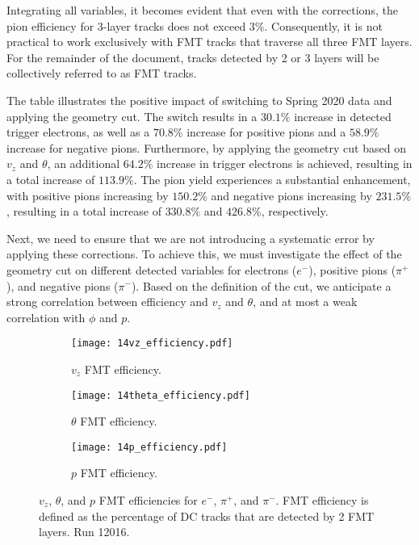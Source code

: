     Integrating all variables, it becomes evident that even with the corrections, the pion efficiency for 3-layer tracks does not exceed $3\%$.
    Consequently, it is not practical to work exclusively with FMT tracks that traverse all three FMT layers.
    For the remainder of the document, tracks detected by 2 or 3 layers will be collectively referred to as FMT tracks.

    The table illustrates the positive impact of switching to Spring 2020 data and applying the geometry cut.
    The switch results in a $30.1\%$ increase in detected trigger electrons, as well as a $70.8\%$ increase for positive pions and a $58.9\%$ increase for negative pions.
    Furthermore, by applying the geometry cut based on $v_z$ and $\theta$, an additional $64.2\%$ increase in trigger electrons is achieved, resulting in a total increase of $113.9\%$.
    The pion yield experiences a substantial enhancement, with positive pions increasing by $150.2\%$ and negative pions increasing by $231.5\%$, resulting in a total increase of $330.8\%$ and $426.8\%$, respectively.

    Next, we need to ensure that we are not introducing a systematic error by applying these corrections.
    To achieve this, we must investigate the effect of the geometry cut on different detected variables for electrons ($e^-$), positive pions ($\pi^+$), and negative pions ($\pi^-$).
    Based on the definition of the cut, we anticipate a strong correlation between efficiency and $v_z$ and $\theta$, and at most a weak correlation with $\phi$ and $p$.

    \begin{figure}
        \begin{subfigure}[b]{\textwidth}
            \texttt{[image: 14vz\_efficiency.pdf]}
            \caption{$v_z$ FMT efficiency.}
            \label{fig::14.14::fmt_efficiency_vz}
        \end{subfigure}
        \begin{subfigure}[b]{\textwidth}
            \texttt{[image: 14theta\_efficiency.pdf]}
            \caption{$\theta$ FMT efficiency.}
            \label{fig::14.14::fmt_efficiency_theta}
        \end{subfigure}
        \begin{subfigure}[b]{\textwidth}
            \texttt{[image: 14p\_efficiency.pdf]}
            \caption{$p$ FMT efficiency.}
            \label{fig::14.14::fmt_efficiency_p}
        \end{subfigure}

        \caption[$v_z$, $\theta$, and $p$ FMT efficiencies for $e^-$, $\pi^+$, and $\pi^-$ in run 12016]
        {$v_z$, $\theta$, and $p$ FMT efficiencies for $e^-$, $\pi^+$, and $\pi^-$.
        FMT efficiency is defined as the percentage of DC tracks that are detected by 2 FMT layers.
        Run 12016.}
        \label{fig::14.14::fmt_efficiencies}
    \end{figure}

